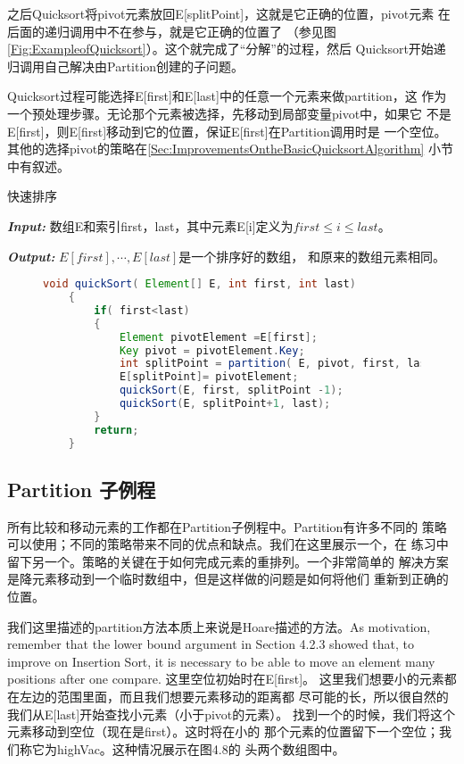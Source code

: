之后Quicksort将pivot元素放回E[splitPoint]，这就是它正确的位置，pivot元素
在后面的递归调用中不在参与，就是它正确的位置了
（参见图\ref{Fig:ExampleofQuicksort}）。这个就完成了“分解”的过程，然后
Quicksort开始递归调用自己解决由Partition创建的子问题。

Quicksort过程可能选择E[first]和E[last]中的任意一个元素来做partition，这
作为一个预处理步骤。无论那个元素被选择，先移动到局部变量pivot中，如果它
不是E[first]，则E[first]移动到它的位置，保证E[first]在Partition调用时是
一个空位。其他的选择pivot的策略在\ref{Sec:ImprovementsOntheBasicQuicksortAlgorithm}
小节中有叙述。

\begin{algorithm}\label{Algo:Quicksort}
快速排序

{\textbf{\emph{Input:}}} 数组E和索引first，last，其中元素E[i]定义为$first≤i≤last$。

{\textbf{\emph{Output:}}} $E[first],\cdots,E[last]$是一个排序好的数组，
和原来的数组元素相同。

\begin{figure}
\begin{lstlisting}[language={Java},keywordstyle=\color{blue!70}, commentstyle=\color{red!50!green!50!blue!50}]
    void quickSort( Element[] E, int first, int last)
    {
        if( first<last)
        {
            Element pivotElement =E[first];
            Key pivot = pivotElement.Key;
            int splitPoint = partition( E, pivot, first, last);
            E[splitPoint]= pivotElement;
            quickSort(E, first, splitPoint -1);
            quickSort(E, splitPoint+1, last);
        }
        return;
    }
\end{lstlisting}
\end{figure}

\end{algorithm}

\subsection{Partition 子例程}
所有比较和移动元素的工作都在Partition子例程中。Partition有许多不同的
策略可以使用；不同的策略带来不同的优点和缺点。我们在这里展示一个，在
练习中留下另一个。策略的关键在于如何完成元素的重排列。一个非常简单的
解决方案是降元素移动到一个临时数组中，但是这样做的问题是如何将他们
重新到正确的位置。

我们这里描述的partition方法本质上来说是Hoare描述的方法。As motivation,
remember that the lower bound argument in Section 4.2.3 showed that,
to improve on Insertion Sort, it is necessary to be able to move an
element many positions after one compare. 这里空位初始时在E[first]。
这里我们想要小的元素都在左边的范围里面，而且我们想要元素移动的距离都
尽可能的长，所以很自然的我们从E[last]开始查找小元素（小于pivot的元素）。
找到一个的时候，我们将这个元素移动到空位（现在是first）。这时将在小的
那个元素的位置留下一个空位；我们称它为highVac。这种情况展示在图4.8的
头两个数组图中。

